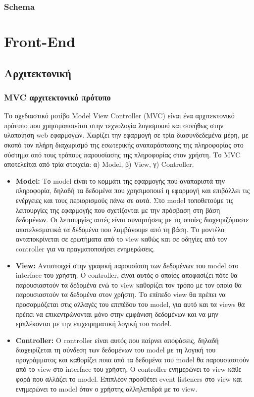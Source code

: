 		\subsubsection{Schema}

\section{Front-End}
	\subsection{Αρχιτεκτονική}
		\subsubsection{MVC αρχιτεκτονικό πρότυπο}\label{sssection:mvc}

		Το σχεδιαστικό μοτίβο Model View Controller (MVC) είναι ένα αρχιτεκτονικό πρότυπο που χρησιμοποιείται στην τεχνολογία λογισμικού και συνήθως στην υλοποίηση web εφαρμογών. Χωρίζει την εφαρμογή σε τρία διασυνδεδεμένα μέρη, με σκοπό τον πλήρη διαχωρισμό της εσωτερικής αναπαράστασης  της πληροφορίας στο σύστημα από τους τρόπους παρουσίασης της πληροφορίας στον χρήστη. Το MVC αποτελείται από τρία στοιχεία: α) Model, β) View, γ) Controller.
		\begin{itemize} 
		\item\textbf{Model:} Το model είναι το κομμάτι της εφαρμογής που αναπαριστά την πληροφορία, δηλαδή τα δεδομένα που χρησιμοποιεί η εφαρμογή και επιβάλλει τις ενέργειες και τους περιορισμούς πάνω σε αυτά.  Στο model τοποθετούμε τις λειτουργίες της εφαρμογής που σχετίζονται με την πρόσβαση στη βάση δεδομένων. Οι λειτουργίες αυτές είναι συναρτήσεις με τις οποίες διαχειριζόμαστε αποτελεσματικά τα δεδομένα που λαμβάνουμε από τη βάση.  Το μοντέλο ανταποκρίνεται σε ερωτήματα από το view καθώς και σε οδηγίες από τον controller για να πραγματοποιήσει ενημερώσεις.
		\item\textbf{View:} Αντιστοιχεί στην γραφική παρουσίαση των δεδομένων του model στο interface του χρήστη. Ο controller, είναι αυτός ο οποίος αποφασίζει πότε θα παρουσιαστούν τα δεδομένα ενώ το view καθορίζει τον τρόπο με τον οποίο θα παρουσιαστούν τα δεδομένα στον χρήστη. Το επίπεδο view θα πρέπει να προσαρμόζεται στις αλλαγές του επιπέδου του model, για αυτό και τα views θα πρέπει να επικεντρώνονται μόνο στην εμφάνιση δεδομένων και να μην εμπλέκονται με την επιχειρηματική λογική του model.
		\item\textbf{Controller:} Ο controller είναι αυτός που παίρνει αποφάσεις, δηλαδή διαχειρίζεται τη σύνδεση των δεδομένων του model με τη λογική του προγράμματος και καθορίζει ποια από τα δεδομένα του model θα παρουσιαστούν από το view στο interface του χρήστη. Ο controller ενημερώνει το view κάθε φορά που αλλάζει το model. Επιπλέον προσθέτει event listeners στο view και ενημερώνει το model όταν ο χρήστης αλληλεπιδρά με το view.
	 \end{itemize}		
